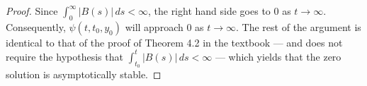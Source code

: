 \documentclass[11pt,oneside,english]{amsart}
\theoremstyle{definition}
\begin{document}
\begin{enumerate}
\begin{proof}
Since $\int_0^\infty |B(s)|\,ds<\infty$, the right hand side goes to 0 as $t\rightarrow \infty$. Consequently, $\psi(t,t_0,y_0)$ will approach 0 as $t\rightarrow\infty$. The rest of the argument is identical to that of the proof of Theorem 4.2 in the textbook --- and does not require the hypothesis that $\int_{t_0}^t|B(s)|\,ds<\infty$ --- which yields that the zero solution is asymptotically stable.


\end{proof}












\end{enumerate}
\end{document}
